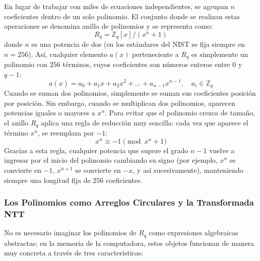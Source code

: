 En lugar de trabajar con miles de ecuaciones independientes, se agrupan $n$ coeficientes dentro de un solo polinomio. El conjunto donde se realizan estas operaciones se denomina anillo de polinomios y se representa como:
\begin{equation}
	R_q = \mathbb{Z}_q[x] / (x^n + 1)
\end{equation}
donde $n$ es una potencia de dos (en los estándares del NIST se fija siempre en $n = 256$). Así, cualquier elemento $a(x)$ perteneciente a $R_q$ es simplemente un polinomio con $256$ términos, cuyos coeficientes son números enteros entre $0$ y $q-1$:
\begin{equation}
	a(x) = a_0 + a_1 x + a_2 x^2 + \dots + a_{n-1} x^{n-1}, \quad a_i \in \mathbb{Z}_q
\end{equation}
Cuando se suman dos polinomios, simplemente se suman sus coeficientes posición por posición. Sin embargo, cuando se multiplican dos polinomios, aparecen potencias iguales o mayores a $x^n$. Para evitar que el polinomio crezca de tamaño, el anillo $R_q$ aplica una regla de reducción muy sencilla: cada vez que aparece el término $x^n$, se reemplaza por $-1$:
\begin{equation}
	x^n \equiv -1 \pmod{x^n + 1}
\end{equation}
Gracias a esta regla, cualquier potencia que supere el grado $n-1$ vuelve a ingresar por el inicio del polinomio cambiando su signo (por ejemplo, $x^n$ se convierte en $-1$, $x^{n+1}$ se convierte en $-x$, y así sucesivamente), manteniendo siempre una longitud fija de $256$ coeficientes.

\subsubsection{Los Polinomios como Arreglos Circulares y la Transformada NTT}

No es necesario imaginar los polinomios de $R_q$ como expresiones algebraicas abstractas; en la memoria de la computadora, estos objetos funcionan de manera muy concreta a través de tres características:


